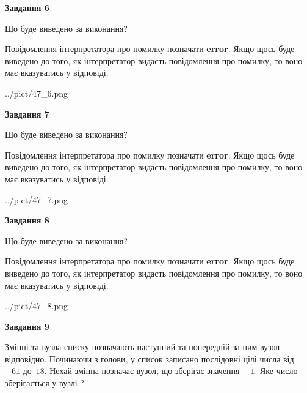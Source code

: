 \documentclass[12pt, ukrainian]{article}
\begin{document}
{\begin {large}
{\begin {center}\textbf{Завдання 6}\end {center}}\par
Що буде виведено за виконання?

Повідомлення інтерпретатора про помилку позначати \textbf{error}.
Якщо щось буде виведено до того, як інтерпретатор видасть повідомлення про помилку, 
то воно має вказуватись у відповіді. \par


\begin{center}
	{../pict/47_6.png}
\end{center}
\newpage

{\begin {center}\textbf{Завдання 7}\end {center}}\par
Що буде виведено за виконання?

Повідомлення інтерпретатора про помилку позначати \textbf{error}.
Якщо щось буде виведено до того, як інтерпретатор видасть повідомлення про помилку, 
то воно має вказуватись у відповіді. \par


\begin{center}
	{../pict/47_7.png}
\end{center}
\newpage

{\begin {center}\textbf{Завдання 8}\end {center}}\par
Що буде виведено за виконання?

Повідомлення інтерпретатора про помилку позначати \textbf{error}.
Якщо щось буде виведено до того, як інтерпретатор видасть повідомлення про помилку, 
то воно має вказуватись у відповіді. \par


\begin{center}
	{../pict/47_8.png}
\end{center}
\newpage

{\begin {center}\textbf{Завдання 9}\end {center}}\par
Змінні  та  вузла списку позначають наступний та попередній за ним вузол відповідно. Починаючи з голови, у список записано послідовні цілі числа від~$-61$ до~$18$. Нехай змінна  позначає вузол, що зберігає значення~$-1$.
Яке число зберігається у вузлі  ?\par
\newpage


\end{large}}
\end{document}
